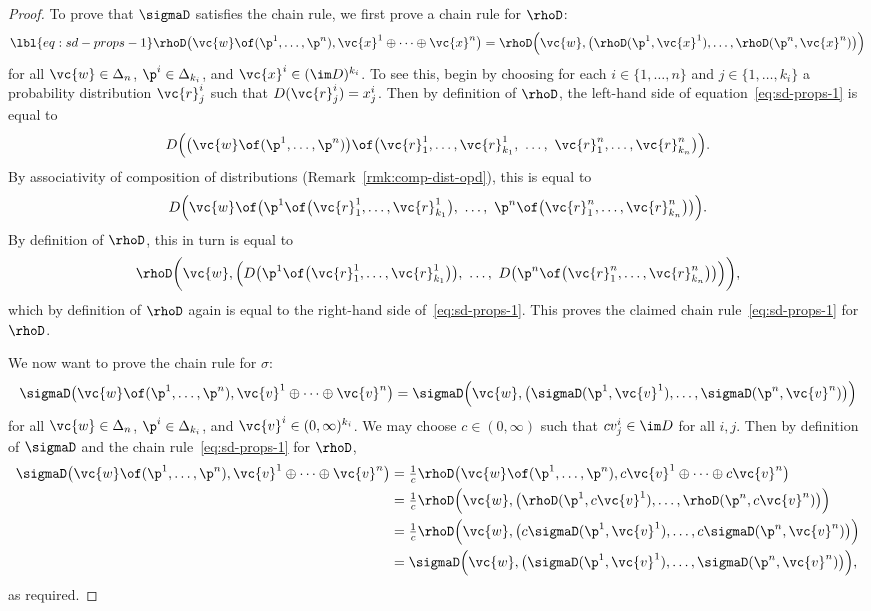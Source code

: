 \begin{proof}
To prove that $\sigmaD$ satisfies the chain rule, we first prove a chain
rule for $\rhoD$:
% 
\begin{equation}
\lbl{eq:sd-props-1}
\rhoD\bigl( 
\vc{w} \of (\p^1, \ldots, \p^n), 
\vc{x}^1 \oplus\cdots\oplus \vc{x}^n
\bigr)  
=
\rhoD \Bigl( 
\vc{w}, \bigl(
\rhoD(\p^1, \vc{x}^1), \ldots, \rhoD(\p^n, \vc{x}^n) 
\bigr)
\Bigr)
\end{equation}
% 
for all $\vc{w} \in \Delta_n$, $\p^i \in \Delta_{k_i}$, and $\vc{x}^i \in
(\im D)^{k_i}$.  To see this, begin by choosing for each $i \in \{1,
\ldots, n\}$ and $j \in \{1, \ldots, k_i\}$ a probability distribution
$\vc{r}^i_j$ such that $D(\vc{r}^i_j) = x^i_j$.  Then by definition of
$\rhoD$, the left-hand side of equation~\eqref{eq:sd-props-1} is equal to 
\[
D\Bigl( 
\bigl( \vc{w} \of (\p^1, \ldots, \p^n) \bigr)
\of
\bigl(\vc{r}^1_1, \ldots, \vc{r}^1_{k_1}, 
\ \ldots, \ 
\vc{r}^n_1, \ldots, \vc{r}^n_{k_n}\bigr)
\Bigr).
\]
By associativity of composition of distributions
(Remark~\ref{rmk:comp-dist-opd}), this is equal to
\[
D\Bigl(\vc{w} \of
\bigl( \p^1 \of \bigl(\vc{r}^1_1, \ldots, \vc{r}^1_{k_1}\bigr), 
\ \ldots, \ 
\p^n \of \bigl(\vc{r}^n_1, \ldots, \vc{r}^n_{k_n}\bigr)
\bigr)
\Bigr).
\]
By definition of $\rhoD$, this in turn is equal to
\[
\rhoD \biggl( \vc{w},
\Bigl(
D\bigl( \p^1 \of \bigl(\vc{r}^1_1, \ldots, \vc{r}^1_{k_1}\bigr) \bigr),
\ \ldots, \ 
D\bigl( \p^n \of \bigl(\vc{r}^n_1, \ldots, \vc{r}^n_{k_n}\bigr) \bigr)
\Bigr)
\biggr),
\]
which by definition of $\rhoD$ again is equal to the right-hand side
of~\eqref{eq:sd-props-1}.  This proves the claimed chain
rule~\eqref{eq:sd-props-1} for $\rhoD$.

We now want to prove the chain rule for $\sigma$:
\[
\sigmaD\bigl( 
\vc{w} \of (\p^1, \ldots, \p^n), 
\vc{v}^1 \oplus\cdots\oplus \vc{v}^n
\bigr)          
=
\sigmaD \Bigl( 
\vc{w}, \bigl(
\sigmaD(\p^1, \vc{v}^1), \ldots, \sigmaD(\p^n, \vc{v}^n) 
\bigr)
\Bigr)
\]
for all $\vc{w} \in \Delta_n$, $\p^i \in \Delta_{k_i}$, and $\vc{v}^i \in
(0, \infty)^{k_i}$.  We may choose $c \in (0, \infty)$ such that $cv^i_j
\in \im D$ for all $i, j$.  Then by definition of $\sigmaD$ and
the chain rule~\eqref{eq:sd-props-1} for $\rhoD$,
% 
\begin{align*}
\sigmaD \bigl( \vc{w} \of (\p^1, \ldots, \p^n), 
\vc{v}^1 \oplus\cdots\oplus \vc{v}^n \bigr)     %
&
=
\tfrac{1}{c} \rhoD \bigl( \vc{w} \of (\p^1, \ldots, \p^n),
c\vc{v}^1 \oplus\cdots\oplus c\vc{v}^n \bigr)   \\
&
=
\tfrac{1}{c} \rhoD \Bigl( \vc{w},
\bigl( \rhoD(\p^1, c\vc{v}^1), \ldots, \rhoD(\p^n, c\vc{v}^n) \bigr)
\Bigr)  \\
&
=
\tfrac{1}{c} \rhoD \Bigl( \vc{w},
\bigl( c\sigmaD(\p^1, \vc{v}^1), \ldots, c\sigmaD(\p^n, \vc{v}^n) \bigr)
\Bigr)  \\
&
=
\sigmaD\Bigl( \vc{w},
\bigl( \sigmaD(\p^1, \vc{v}^1), \ldots, \sigmaD(\p^n, \vc{v}^n) \bigr)
\Bigr),
\end{align*}
% 
as required.
\end{proof}

